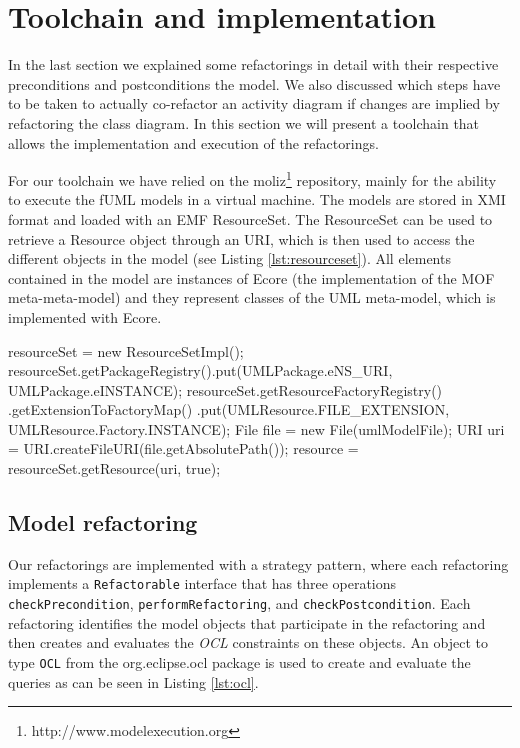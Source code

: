 \documentclass{llncs}
\begin{document}

\clearpage
\section{Toolchain and implementation}
\label{sec:toolchain}
In the last section we explained some refactorings in detail with their respective preconditions and postconditions the model. 
We also discussed which steps have to be taken to actually co-refactor an activity diagram if changes are implied by refactoring 
the class diagram. In this section we will present a toolchain that allows the implementation and execution of the refactorings.

For our toolchain we have relied on the moliz\footnote{http://www.modelexecution.org} repository, mainly for the ability to execute the fUML 
models in a virtual machine. The models are stored in XMI format and loaded with an EMF ResourceSet. The ResourceSet
can be used to retrieve a Resource object through an URI, which is then used to access the different objects in the model 
(see Listing \ref{lst:resourceset}). All elements contained in the model are instances of Ecore (the implementation of
the MOF meta-meta-model) and they represent classes of the UML meta-model, which is implemented with Ecore.

\begin{lstsingle}[language=Java,caption=Getting the resourceset,label=lst:resourceset]
resourceSet = new ResourceSetImpl();
resourceSet.getPackageRegistry().put(UMLPackage.eNS_URI,
                                     UMLPackage.eINSTANCE);
resourceSet.getResourceFactoryRegistry()
    .getExtensionToFactoryMap()
    .put(UMLResource.FILE_EXTENSION,
         UMLResource.Factory.INSTANCE);
File file = new File(umlModelFile);
URI uri = URI.createFileURI(file.getAbsolutePath());
    resource = resourceSet.getResource(uri, true);
\end{lstsingle}

\subsection{Model refactoring}
Our refactorings are implemented with a strategy pattern, where each refactoring implements a \texttt{Refactorable}
interface that has three operations \texttt{checkPrecondition}, \texttt{performRefactoring}, and \texttt{checkPostcondition}. 
Each refactoring identifies the model objects that participate in the refactoring and then creates and evaluates the \textit{OCL} 
constraints on these objects. An object to type \texttt{OCL} from the org.eclipse.ocl package is used to create and evaluate the 
queries as can be seen in Listing \ref{lst:ocl}.
\end{document}
